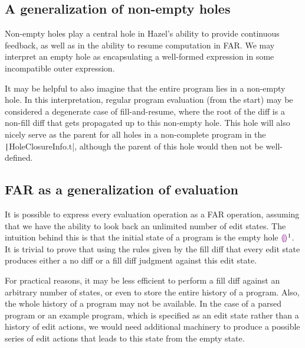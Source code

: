 \subsection{A generalization of non-empty holes}
\label{sec:generalized-neholes}

Non-empty holes play a central hole in Hazel's ability to provide continuous feedback, as well as in the ability to resume computation in FAR. We may interpret an empty hole as encapsulating a well-formed expression in some incompatible outer expression.

It may be helpful to also imagine that the entire program lies in a non-empty hole. In this interpretation, regular program evaluation (from the start) may be considered a degenerate case of fill-and-resume, where the root of the diff is a non-fill diff that gets propagated up to this non-empty hole. This hole will also nicely serve as the parent for all holes in a non-complete program in the \texttt|HoleClosureInfo.t|, although the parent of this hole would then not be well-defined.

\subsection{FAR as a generalization of evaluation}
\label{sec:generalized-far}

It is possible to express every evaluation operation as a FAR operation, assuming that we have the ability to look back an unlimited number of edit states. The intuition behind this is that the initial state of a program is the empty hole $\textcolor{violet}{\llparenthesis}\textcolor{violet}{\rrparenthesis}^1$. It is trivial to prove that using the rules given by the fill diff that every edit state produces either a no diff or a fill diff judgment against this edit state.

For practical reasons, it may be less efficient to perform a fill diff against an arbitrary number of states, or even to store the entire history of a program. Also, the whole history of a program may not be available. In the case of a parsed program or an example program, which is specified as an edit state rather than a history of edit actions, we would need additional machinery to produce a possible series of edit actions that leads to this state from the empty state.


